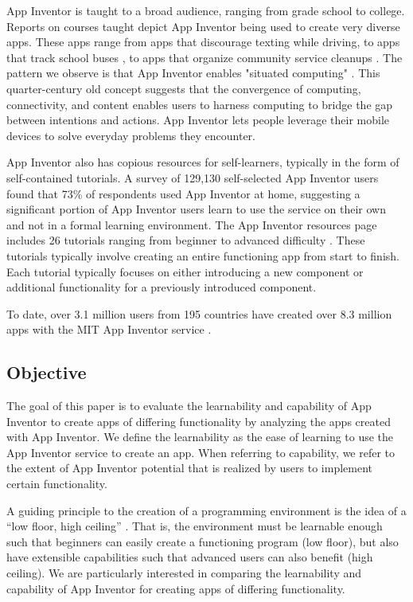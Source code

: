 \documentclass[conference]{IEEEtran}
\begin{document}
App Inventor is taught to a broad audience, ranging from grade school to college. Reports on courses taught depict App Inventor being used to create very diverse apps. These apps range from apps that discourage texting while driving, to apps that track school buses \cite{thinking:turbak}, to apps that organize community service cleanups \cite{democratizing:wolber}. The pattern we observe is that App Inventor enables "situated computing" \cite{situated:gershman}. This quarter-century old concept suggests that the convergence of computing, connectivity, and content enables users to harness computing to bridge the gap between intentions and actions. App Inventor lets people leverage their mobile devices to solve everyday problems they encounter.

App Inventor also has copious resources for self-learners, typically in the form of self-contained tutorials. A survey of 129,130 self-selected App Inventor users found that 73\% of respondents used App Inventor at home, suggesting a significant portion of App Inventor users learn to use the service on their own and not in a formal learning environment. The App Inventor resources page includes 26 tutorials ranging from beginner to advanced difficulty \cite{ai_tutorials}. These tutorials typically involve creating an entire functioning app from start to finish. Each tutorial typically focuses on either introducing a new component or additional functionality for a previously introduced component.

To date, over 3.1 million users from 195 countries have created over 8.3 million apps with the MIT App Inventor service \cite{ai_home}.


\subsection{Objective}
The goal of this paper is to evaluate the learnability and capability of App Inventor to create apps of differing functionality by analyzing the apps created with App Inventor. We define the learnability as the ease of learning to use the App Inventor service to create an app. When referring to capability, we refer to the extent of App Inventor potential that is realized by users to implement certain functionality.

A guiding principle to the creation of a programming environment is the idea of a “low floor, high ceiling” \cite{CT:Grover}. That is, the environment must be learnable enough such that beginners can easily create a functioning program (low floor), but also have extensible capabilities such that advanced users can also benefit (high ceiling). We are particularly interested in comparing the learnability and capability of App Inventor for creating apps of differing functionality.
\end{document}
